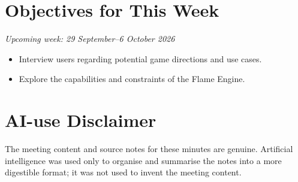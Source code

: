 \documentclass[12pt,a4paper]{article}
\begin{document}
\section{Objectives for This Week}

\noindent\textit{Upcoming week: 29 September--6 October 2026}
\begin{itemize}[leftmargin=*]
    \item Interview users regarding potential game directions and use cases.
    \item Explore the capabilities and constraints of the Flame Engine.
\end{itemize}

\section*{\small AI-use Disclaimer}
\small The meeting content and source notes for these minutes are genuine. Artificial intelligence was used only to organise and summarise the notes into a more digestible format; it was not used to invent the meeting content.
\end{document}
